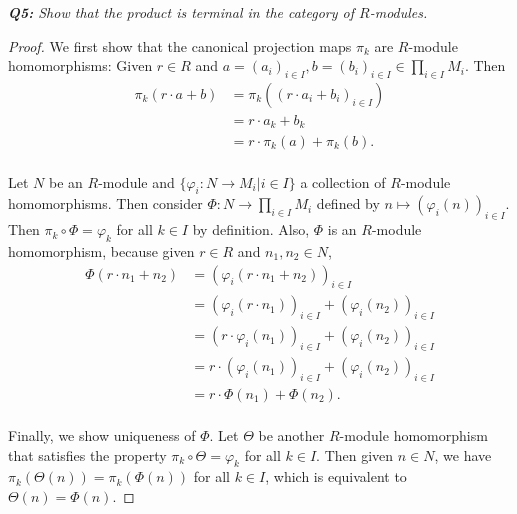 \documentclass{article}
\begin{document}
\it \textbf{Q5:} Show that the product is terminal in the category of
  $R$-modules.
  \begin{proof}
    We first show that the canonical projection maps $\pi_k$ are $R$-module
    homomorphisms: Given $r\in R$ and $a=(a_i)_{i\in I}, b=(b_i)_{i\in I}\in
    \prod_{i\in I}M_i$. Then
    \begin{align*}
      \pi_k(r\cdot a+b) &=\pi_k((r\cdot a_i+b_i)_{i\in I})\\
      &=r\cdot a_k +b_k\\
      &=r\cdot\pi_k(a) +\pi_k(b).\\
    \end{align*}

    Let $N$ be an $R$-module and $\{\varphi_i:N\rightarrow M_i|i\in I\}$ a
    collection of $R$-module homomorphisms. Then consider
    $\Phi:N\rightarrow\prod_{i\in I}M_i$ defined by
    $n\mapsto(\varphi_i(n))_{i\in I}$. Then $\pi_k\circ\Phi=\varphi_k$ for
    all $k\in I$ by definition. Also, $\Phi$ is an $R$-module homomorphism,
    because given $r\in R$ and $n_1,n_2\in N$,
    \begin{align*}
      \Phi(r\cdot n_1+n_2) &=(\varphi_i(r\cdot n_1+n_2))_{i\in I}\\
      &=(\varphi_i(r\cdot n_1))_{i\in I} +(\varphi_i(n_2))_{i\in I}\\
      &=(r\cdot\varphi_i(n_1))_{i\in I} +(\varphi_i(n_2))_{i\in I}\\
      &=r\cdot(\varphi_i(n_1))_{i\in I} +(\varphi_i(n_2))_{i\in I}\\
      &=r\cdot\Phi(n_1) +\Phi(n_2).\\
    \end{align*}

    Finally, we show uniqueness of $\Phi$. Let $\Theta$ be another
    $R$-module homomorphism that satisfies the property
    $\pi_k\circ\Theta=\varphi_k$ for all $k\in I$. Then given $n\in N$, we
    have $\pi_k(\Theta(n))=\pi_k(\Phi(n))$ for all $k\in I$, which is
    equivalent to $\Theta(n)=\Phi(n)$.
  \end{proof}
\end{document}
